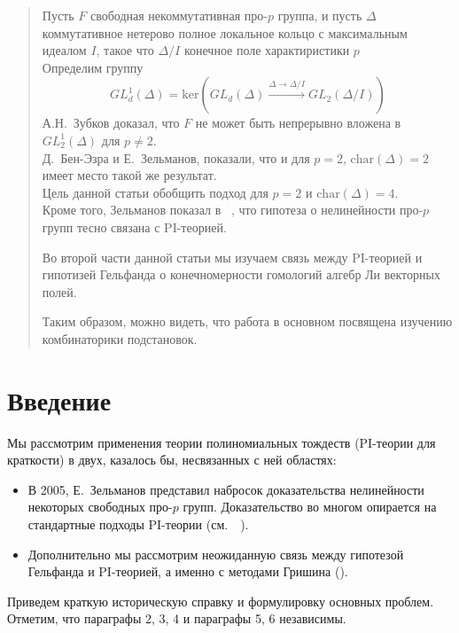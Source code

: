 \documentclass[12pt,a4paper]{article}
\begin{document}


    \begin{abstract}
        Пусть $F$ свободная некоммутативная про-$p$ группа, и пусть $\Delta$ коммутативное нетерово полное локальное кольцо с максимальным идеалом $I$, такое что
        $\Delta/I$ конечное поле характиристики $p$\\
        Определим группу
        \[GL_d^1(\Delta) = \mathrm{ker}\left( GL_d(\Delta) \xrightarrow{\Delta\to\Delta/I} GL_2(\Delta/I) \right)\]
        А.Н.\ Зубков доказал, что $F$ не может быть непрерывно вложена в $GL_2^1(\Delta)$ для $p\neq2$.\\
        Д.\ Бен-Эзра и Е.\ Зельманов, показали, что и для $p=2$, $\mathrm{char}(\Delta)=2$ имеет место такой же результат.\\
        Цель данной статьи обобщить подход для $p=2$ и $\mathrm{char}(\Delta)=4$.\\
        Кроме того, Зельманов показал в ~\cite{Zelmanov1}, что гипотеза о нелинейности про-$p$ групп тесно связана с PI-теорией.

        Во второй части данной статьи мы изучаем связь между PI-теорией и гипотизей Гельфанда о конечномерности гомологий алгебр Ли векторных полей.

        Таким образом, можно видеть, что работа в основном посвящена изучению комбинаторики подстановок.
    \end{abstract}
    \tableofcontents


    \section{Введение}
    Мы рассмотрим применения теории полиномиальных тождеств (PI-теории для краткости) в двух, казалось бы, несвязанных с ней областях:
    \begin{itemize}
        \item В 2005, Е.\ Зельманов представил набросок доказательства нелинейности некоторых свободных про-$p$ групп.
        Доказательство во многом опирается на стандартные подходы PI-теории (см.\ ~\cite{Zelmanov1}).
        \item Дополнительно мы рассмотрим неожиданную связь между гипотезой Гельфанда и PI-теорией, а именно с методами Гришина (\cite{Grishin}).
    \end{itemize}

    Приведем краткую историческую справку и формулировку основных проблем.
    Отметим, что параграфы 2, 3, 4 и параграфы 5, 6 независимы.
\end{document}
